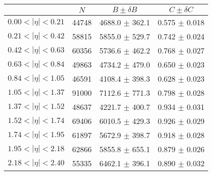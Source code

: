 \begin{tabular}{lccc}
\hline
    &   $N$   & $B \pm \delta B$  &  $C \pm \delta C$ \\
\hline
$0.00 < |\eta| <0.21$          & 44748      & 4688.0     $\pm$ 362.1 & 0.575      $\pm$ 0.018 \\
$0.21 < |\eta| <0.42$          & 58815      & 5855.0     $\pm$ 529.7 & 0.742      $\pm$ 0.024 \\
$0.42 < |\eta| <0.63$          & 60356      & 5736.6     $\pm$ 462.2 & 0.768      $\pm$ 0.027 \\
$0.63 < |\eta| <0.84$          & 49863      & 4734.2     $\pm$ 479.0 & 0.650      $\pm$ 0.023 \\
$0.84 < |\eta| <1.05$          & 46591      & 4108.4     $\pm$ 398.3 & 0.628      $\pm$ 0.023 \\
$1.05 < |\eta| <1.37$          & 91000      & 7112.6     $\pm$ 771.3 & 0.798      $\pm$ 0.028 \\
$1.37 < |\eta| <1.52$          & 48637      & 4221.7     $\pm$ 400.7 & 0.934      $\pm$ 0.031 \\
$1.52 < |\eta| <1.74$          & 69406      & 6010.5     $\pm$ 429.3 & 0.926      $\pm$ 0.029 \\
$1.74 < |\eta| <1.95$          & 61897      & 5672.9     $\pm$ 398.7 & 0.918      $\pm$ 0.028 \\
$1.95 < |\eta| <2.18$          & 62866      & 5855.8     $\pm$ 655.1 & 0.879      $\pm$ 0.026 \\
$2.18 < |\eta| <2.40$          & 55335      & 6462.1     $\pm$ 396.1 & 0.890      $\pm$ 0.032 \\
\hline
\end{tabular}
